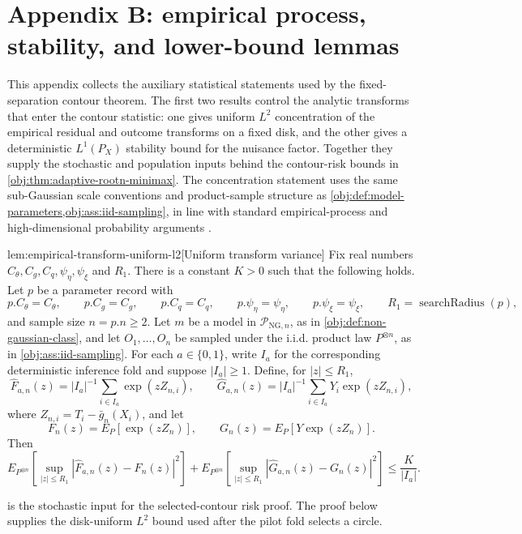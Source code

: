 \section{Appendix B: empirical process, stability, and lower-bound lemmas}

This appendix collects the auxiliary statistical statements used by the fixed-separation contour theorem. The first two results control the analytic transforms that enter the contour statistic: one gives uniform \(L^2\) concentration of the empirical residual and outcome transforms on a fixed disk, and the other gives a deterministic \(L^1(P_X)\) stability bound for the nuisance factor. Together they supply the stochastic and population inputs behind the contour-risk bounds in \cref{obj:thm:adaptive-rootn-minimax}. The concentration statement uses the same sub-Gaussian scale conventions and product-sample structure as \cref{obj:def:model-parameters,obj:ass:iid-sampling}, in line with standard empirical-process and high-dimensional probability arguments \citep{VanDerVaart1998,VanDerVaartWellner1996,Vershynin2018,Wainwright2019}.

\begin{lemmav}{lem:empirical-transform-uniform-l2}[Uniform transform variance]
Fix real numbers \(C_{\theta},C_g,C_q,\psi_{\eta},\psi_{\xi}\) and \(R_1\). There is a constant \(K>0\) such that the following holds. Let \(p\) be a parameter record with
\[
p.C_{\theta}=C_{\theta},\qquad
p.C_g=C_g,\qquad
p.C_q=C_q,\qquad
p.\psi_{\eta}=\psi_{\eta},\qquad
p.\psi_{\xi}=\psi_{\xi},\qquad
R_1=\operatorname{searchRadius}(p),
\]
and sample size \(n=p.n\ge2\). Let \(m\) be a model in \(\mathcal P_{\mathrm{NG},n}\), as in \cref{obj:def:non-gaussian-class}, and let \(O_1,\ldots,O_n\) be sampled under the i.i.d. product law \(P^{\otimes n}\), as in \cref{obj:ass:iid-sampling}. For each \(a\in\{0,1\}\), write \(I_a\) for the corresponding deterministic inference fold and suppose \(|I_a|\ge1\). Define, for \(|z|\le R_1\),
\[
\widehat F_{a,n}(z)=|I_a|^{-1}\sum_{i\in I_a}\exp(zZ_{n,i}),
\qquad
\widehat G_{a,n}(z)=|I_a|^{-1}\sum_{i\in I_a}Y_i\exp(zZ_{n,i}),
\]
where \(Z_{n,i}=T_i-\bar g_n(X_i)\), and let
\[
F_n(z)=E_P[\exp(zZ_n)],
\qquad
G_n(z)=E_P[Y\exp(zZ_n)].
\]
Then
\[
E_{P^{\otimes n}}\!\left[\sup_{|z|\le R_1}
|\widehat F_{a,n}(z)-F_n(z)|^2\right]
+
E_{P^{\otimes n}}\!\left[\sup_{|z|\le R_1}
|\widehat G_{a,n}(z)-G_n(z)|^2\right]
\le
\frac{K}{|I_a|}.
\]
\end{lemmav}

 is the stochastic input for the selected-contour risk proof. The proof below supplies the disk-uniform \(L^2\) bound used after the pilot fold selects a circle.

